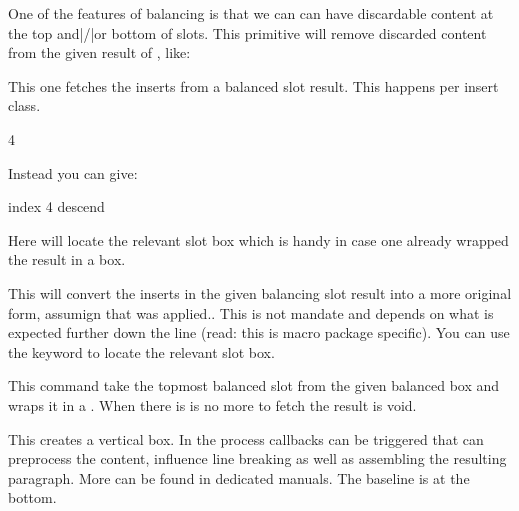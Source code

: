 \stopnewprimitive

\startnewprimitive[title={\prm {vbalanceddiscard}}]

One of the features of balancing is that we can can have discardable content at
the top and|/|or bottom of slots. This primitive will remove discarded content
from the given result of \type {\vbalance}, like:

\starttyping
{} 
\stoptyping

\stopnewprimitive

\startnewprimitive[title={\prm {vbalancedinsert}}]

This one fetches the inserts from a balanced slot result. This happens per insert
class.

\starttyping
{}  4
\stoptyping

Instead you can give:

\starttyping
{}  index 4 descend \relax
\stoptyping

Here  will locate the relevant slot box which is handy in case one
already wrapped the result in a box.

\stopnewprimitive

\startnewprimitive[title={\prm {vbalancedreinsert}}]

This will convert the inserts in the given balancing slot result into a more
original form, assumign that  was applied.. This is not
mandate and depends on what is expected further down the line (read: this is
macro package specific). You can use the keyword  to locate the
relevant slot box.

\stopnewprimitive

\startnewprimitive[title={\prm {vbalancedtop}}]

This command take the topmost balanced slot from the given balanced box and wraps
it in a \type {\vbox}. When there is is no more to fetch the result is void.

\stopnewprimitive

\startoldprimitive[title={\prm {vbox}}]

This creates a vertical box. In the process callbacks can be triggered that can
preprocess the content, influence line breaking as well as assembling the
resulting paragraph. More can be found in dedicated manuals. The baseline is
at the bottom.

\stopoldprimitive

\startoldprimitive[title={\prm {vcenter}}]

